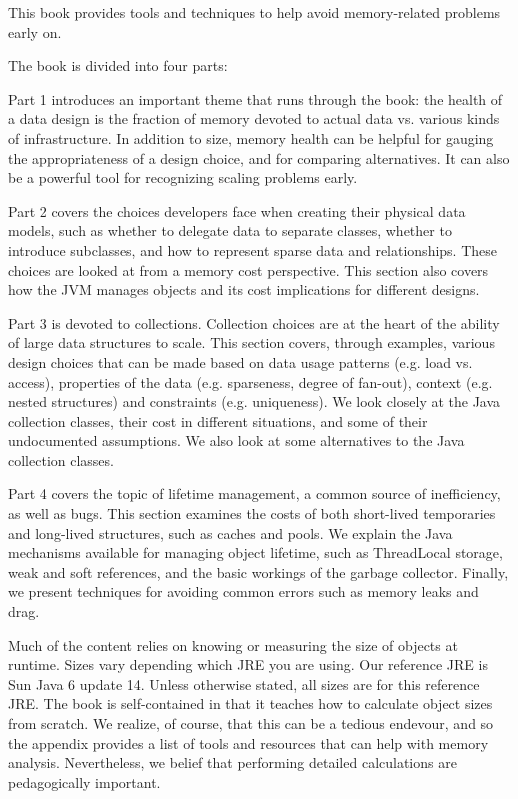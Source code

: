   This book provides tools and techniques to help avoid memory-related problems early on. 


The book is divided into four parts:

Part 1 introduces an important theme that runs through the book: the
health of a data design is the fraction of memory devoted to actual data vs. various kinds of infrastructure. In addition to size, memory health can be helpful for gauging the appropriateness of a design choice, and for comparing alternatives. It can also be a powerful tool for recognizing scaling problems early.

Part 2 covers the choices developers face when creating their physical data models, such as whether to delegate data to separate classes, whether to introduce subclasses, and how to represent sparse data and relationships. These choices are looked at from a memory cost perspective. This section also covers how the JVM manages objects and its cost implications for different designs.
  
Part 3 is devoted to collections. Collection choices are at the heart of the ability of large data structures to scale. This section covers, through examples, various design choices that can be made based on data usage patterns (e.g. load vs. access), properties of the data (e.g. sparseness, degree of fan-out), context (e.g. nested structures) and constraints (e.g. uniqueness).  We look closely at the Java collection classes, their cost in different situations, and some of their undocumented assumptions. We also look at some alternatives to the Java collection classes.
 
Part 4 covers the topic of lifetime management, a common source of inefficiency, as well as bugs. This section examines the costs of both short-lived temporaries and long-lived structures, such as caches and pools.  We explain the Java mechanisms available for managing object lifetime, such as ThreadLocal storage, weak and soft references, and the basic workings of the garbage collector. Finally, we present techniques for avoiding common errors such as memory leaks and drag.



Much of the content relies on knowing or measuring the size of objects at runtime. Sizes vary depending which JRE you are using. Our reference JRE is Sun Java 6 update 14. Unless otherwise stated, all sizes are for this reference JRE. The book is self-contained in that it teaches how to calculate object sizes from scratch. We realize, of course, that this can be a tedious endevour, and so the appendix provides a list of tools and resources that can help with memory analysis. Nevertheless, we belief that performing detailed calculations are pedagogically important. 


